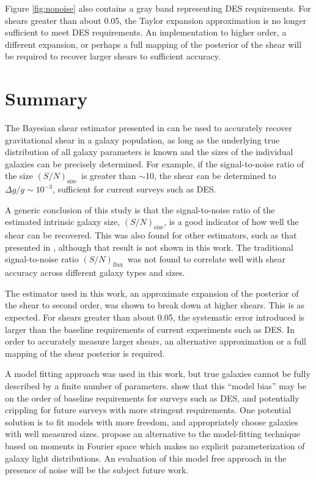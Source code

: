 \documentclass[12pt,preprint]{aastex}
\newcommand{\Tsn}{$(S/N)_{\textrm{size}}$}
\newcommand{\fsn}{$(S/N)_{\textrm{flux}}$}
\begin{document}
Figure \ref{fig:nonoise} also contains a gray band representing DES
requirements.  For shears greater than about 0.05, the Taylor expansion
approximation is no longer sufficient to meet DES requirements.  An
implementation to higher order, a different expansion, or perhaps a full
mapping of the posterior of the shear will be required to recover larger shears
to sufficient accuracy.

\section{Summary} \label{sec:summary}

The Bayesian shear estimator presented in \cite{ba13} can be used to accurately
recover gravitational shear in a galaxy population, as long as the underlying
true distribution of all galaxy parameters is known and the sizes of the
individual galaxies can be precisely determined.  For example, if the
signal-to-noise ratio of the size \Tsn\ is greater than $\sim$10, the shear
can be determined to $\Delta g/g \sim10^{-3}$, sufficient for current surveys such as DES.

A generic conclusion of this study is that the signal-to-noise ratio of the
estimated intrinsic galaxy size, \Tsn, is a good indicator of how well the
shear can be recovered.  This was also found for other estimators, such as that
presented in \cite{Miller07}, although that result is not shown in this work.
The traditional signal-to-noise ratio \fsn\ was not found to correlate well
with shear accuracy across different galaxy types and sizes.

The estimator used in this work, an approximate expansion of the posterior of
the shear to second order, was shown to break down at higher shears. This is as
expected.  For shears greater than about 0.05, the systematic error introduced
is larger than the baseline requirements of current experiments such as DES.
In order to accurately measure larger shears, an alternative approximation or a
full mapping of the shear posterior is required.

A model fitting approach was used in this work, but true galaxies cannot be
fully described by a finite number of parameters.  \cite{Kacprzak13} show that
this ``model bias'' may be on the order of baseline requirements for surveys
such as DES, and potentially crippling for future surveys with more stringent
requirements. One potential solution is to fit models with more freedom, and
appropriately choose galaxies with well measured sizes.  \cite{ba13} propose an
alternative to the model-fitting technique based on moments in Fourier space
which makes no explicit parameterization of galaxy light distributions.  An
evaluation of this model free approach in the presence of noise will be the
subject future work.
\end{document}
